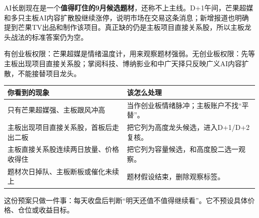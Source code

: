 \begin{dashboardbox}[先说结论]
\begin{houseviewbox}[当前判断]
AI长剧现在是一个\textbf{值得盯住的9月候选题材}，还称不上主线。D+1午间，芒果超媒和多只主板AI内容扩散股继续涨停，说明市场在交易这条消息；新增报道也明确提到芒果TV出品和制作该项目。真正缺的仍是主板项目直接关系股，所以主板龙头战法的标准答案仍为空。
\end{houseviewbox}
\begin{sourcequalitybox}[你现在该怎么理解]
有创业板权限：芒果超媒是情绪温度计，用来观察题材强弱。无创业板权限：先等主板出现项目直接关系股；掌阅科技、博纳影业和中广天择只反映广义AI内容扩散，不能接替项目龙头。
\end{sourcequalitybox}
\end{dashboardbox}

\begin{exhibitbox}[展品：一句话交易地图]
\begin{tabularx}{\textwidth}{L{3.1cm}X}
\toprule
你看到的现象 & 该怎么处理 \\
\midrule
只有芒果超媒强、主板跟风冲高 & 当作创业板情绪脉冲；主板账户不找“平替”。 \\
主板出现项目直接关系股，首板后走出二板 & 把它列为高度龙头候选，进入D+1/D+2复核。 \\
主板直接关系股连续两日放量、价格收得住 & 把它列为容量候选，和高度股二选一观察。 \\
题材次日掉队、主板断板或催化未续上 & 题材假设结束，删除观察标签。 \\
\bottomrule
\end{tabularx}
\end{exhibitbox}

这份预案只做一件事：每天收盘后判断“明天还值不值得继续看”。它不预设具体价格、仓位或收益目标。
